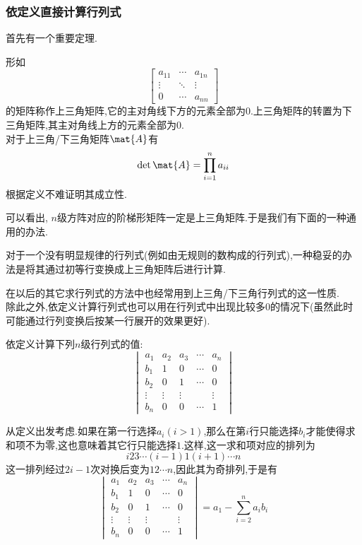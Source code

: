 \documentclass{ctexart}
\begin{document}
\subsubsection{依定义直接计算行列式}
首先有一个重要定理.
\begin{theorem}
    形如
    \[\begin{bmatrix}
        a_{11}&\cdots&a_{1n}\\
        \vdots&\ddots&\vdots\\
        0&\cdots&a_{nn}
    \end{bmatrix}\]
    的矩阵称作上三角矩阵,它的主对角线下方的元素全部为$0$.上三角矩阵的转置为下三角矩阵,其主对角线上方的元素全部为$0$.\\
    对于上三角/下三角矩阵$\mat{A}$有
    \[\det\mat{A}=\prod_{i=1}^{n}a_{ii}\]
    根据定义不难证明其成立性.
\end{theorem}
可以看出, $n$级方阵对应的阶梯形矩阵一定是上三角矩阵.于是我们有下面的一种通用的办法.
\begin{hint}
    对于一个没有明显规律的行列式(例如由无规则的数构成的行列式),一种稳妥的办法是将其通过初等行变换成上三角矩阵后进行计算.
\end{hint}
在以后的其它求行列式的方法中也经常用到上三角/下三角行列式的这一性质.\\
\indent 除此之外,依定义计算行列式也可以用在行列式中出现比较多$0$的情况下(虽然此时可能通过行列变换后按某一行展开的效果更好). 
\begin{problem}
    依定义计算下列$n$级行列式的值:
    \[\begin{vmatrix}
        a_1&a_2&a_3&\cdots&a_n\\
        b_1&1&0&\cdots&0\\
        b_2&0&1&\cdots&0\\
        \vdots&\vdots&\vdots& &\vdots\\
        b_n&0&0&\cdots&1
    \end{vmatrix}\]
\end{problem}
\begin{solution}
    从定义出发考虑.如果在第一行选择$a_i(i>1)$,那么在第$i$行只能选择$b_i$才能使得求和项不为零,这也意味着其它行只能选择$1$.这样,这一求和项对应的排列为
    \[i23\cdots(i-1)1(i+1)\cdots n\]
    这一排列经过$2i-1$次对换后变为$12\cdots n$,因此其为奇排列,于是有
    \[\begin{vmatrix}
        a_1&a_2&a_3&\cdots&a_n\\
        b_1&1&0&\cdots&0\\
        b_2&0&1&\cdots&0\\
        \vdots&\vdots&\vdots& &\vdots\\
        b_n&0&0&\cdots&1
    \end{vmatrix}=a_1-\sum_{i=2}^{n}a_ib_i\]
\end{solution}
\end{document}
